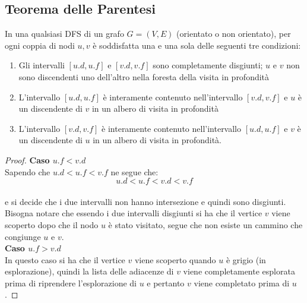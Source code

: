 \subsection{Teorema delle Parentesi}
\colorbox{SALZO}{\parbox{\dimexpr\linewidth-2\fboxsep}{\begin{theorem}
In una qualsiasi DFS di un grafo $G = (V, E)$ (orientato o non orientato), per ogni coppia di
nodi $u, v$ è soddisfatta una e una sola delle seguenti tre condizioni:
\begin{enumerate}
    \item Gli intervalli $[u.d, u.f]$ e $[v.d, v.f]$ sono completamente disgiunti; $u$ e $v$ non sono discendenti
uno dell’altro nella foresta della visita in profondità
    \item L’intervallo $[u.d, u.f]$ è interamente contenuto nell’intervallo $[v.d, v.f]$ e $u$ è un discendente
di $v$ in un albero di visita in profondità
    \item L’intervallo $[v.d, v.f]$ è interamente contenuto nell’intervallo $[u.d, u.f]$ e $v$ è un discendente
di $u$ in un albero di visita in profondità. 
\end{enumerate}   
\end{theorem}}}
\begin{proof}
    \textbf{Caso $u.f < v.d$}\\
    Sapendo che $u.d < u.f < v.f$ ne segue che:\\
    $$ u.d < u.f < v.d < v.f $$\\
    e si decide che i due intervalli non hanno intersezione e quindi sono disgiunti. Bisogna notare che essendo 
    i due intervalli disgiunti si ha che il vertice $v$ viene scoperto dopo che il nodo $u$ è stato visitato, 
    segue che non esiste un cammino che congiunge $u$ e $v$.\\
    \textbf{Caso $u.f > v.d$}\\
    In questo caso si ha che il vertice $v$ viene scoperto quando $u$ è grigio (in esplorazione), quindi
    la lista delle adiacenze di $v$ viene completamente esplorata prima di riprendere l’esplorazione
    di $u$ e pertanto $v$ viene completato prima di $u$.
\end{proof}
